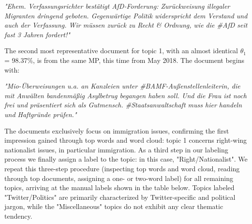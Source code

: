 \vspace{0.5cm}
\noindent
\textit{"Ehem. Verfassungsrichter bestätigt AfD-Forderung: Zurückweisung illegaler Migranten dringend geboten. Gegenwärtige Politik widerspricht dem Verstand und auch der Verfassung. Wir müssen zurück zu Recht \& Ordnung, wie die \#AfD seit fast 3 Jahren fordert!"}
\vspace{0.5cm}

The second most representative document for topic 1, with an almost identical $\theta_1$ = 98.37\%, is from the same MP, this time from May 2018. The document begins with:

\vspace{0.5cm}
\noindent
\textit{"Mio-Überweisungen u.a. an Kanzleien unter \#BAMF-Außenstellenleiterin, die mit Anwälten bandenmäßig Asylbetrug begangen haben soll. Und die Frau ist noch frei und präsentiert sich als Gutmensch. \#Staatsanwaltschaft muss hier handeln und Haftgründe prüfen."}
\vspace{0.5cm}

The documents exclusively focus on immigration issues, confirming the first impression gained through top words and word cloud: topic 1 concerns right-wing nationalist issues, in particular immigration. As a third step in our labeling process we finally assign a label to the topic: in this case, "Right/Nationalist". We repeat this three-step procedure (inspecting top words and word cloud, reading through top documents, assigning a one- or two-word label) for all remaining topics, arriving at the manual labels shown in the table below. Topics labeled "Twitter/Politics" are primarily characterized by Twitter-specific and political jargon, while the "Miscellaneous" topics do not exhibit any clear thematic tendency.

